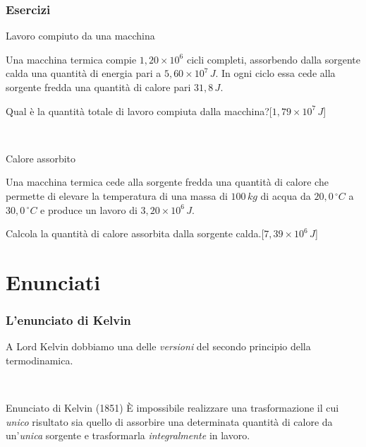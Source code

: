 \documentclass[]{beamer}
\theoremstyle{plain}
\begin{document}
\begin{frame}
\frametitle{Esercizi}
\begin{exampleblock}{Lavoro compiuto da una macchina}
  \small{
  Una macchina termica compie $ 1,20 \times 10^{6} $ cicli completi, assorbendo dalla sorgente calda una quantità di energia pari a $ 5,60 \times 10^{7} \, J $. In ogni ciclo essa cede alla sorgente fredda una quantità di calore pari $ 31,8 \, J $.

  Qual è la quantità totale di lavoro compiuta dalla macchina?\hspace*{\fill}[$ 1,79 \times 10^{7} \, J $]}
\end{exampleblock}

~

\begin{exampleblock}{Calore assorbito}
  \small{
  Una macchina termica cede alla sorgente fredda una quantità di calore che permette di elevare la temperatura di una massa di $ 100 \, kg $ di acqua da $ 20,0 \, ^\circ C $ a $ 30,0 \, ^\circ C $ e produce un lavoro di $ 3,20 \times 10^{6} \, J $.

  Calcola la quantità di calore assorbita dalla sorgente calda.\hspace*{\fill}[$ 7,39 \times 10^{6} \, J $]}
\end{exampleblock}
\end{frame}


\section{Enunciati}

\begin{frame}
  \frametitle{L'enunciato di Kelvin}
  A Lord Kelvin dobbiamo una delle \emph{versioni} del \alert{secondo principio della termodinamica}.
  
  ~
  
  \begin{block}{Enunciato di Kelvin (1851)}
    È impossibile realizzare una trasformazione il cui \emph{unico} risultato sia quello di assorbire una determinata quantità di calore da un’\emph{unica} sorgente e trasformarla \emph{integralmente} in lavoro.
  \end{block}
  \end{frame}
  
\end{document}
